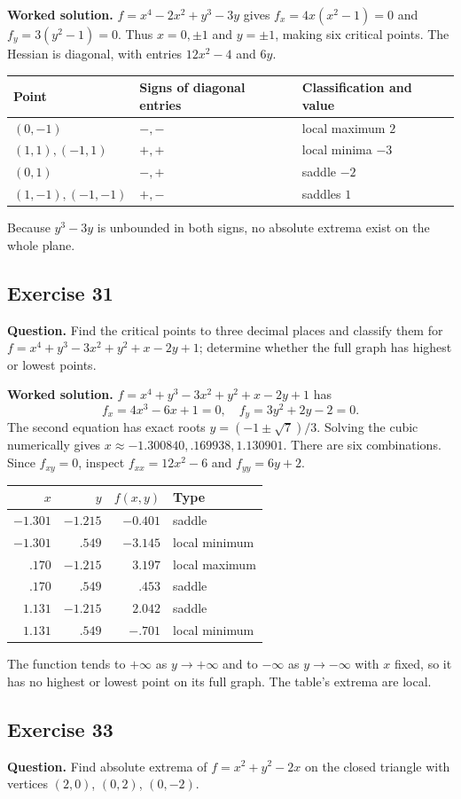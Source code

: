 \documentclass[11pt]{article}
\newcommand{\ex}[1]{\Needspace{8\baselineskip}\subsection*{Exercise #1}}
\begin{document}
\textbf{Worked solution.}
$f=x^4-2x^2+y^3-3y$ gives $f_x=4x(x^2-1)=0$ and $f_y=3(y^2-1)=0$. Thus $x=0,\pm1$ and $y=\pm1$, making six critical points. The Hessian is diagonal, with entries $12x^2-4$ and $6y$.
\begin{center}\begin{tabular}{lll}\toprule Point&Signs of diagonal entries&Classification and value\\\midrule
$(0,-1)$&$-,-$&local maximum $2$\\
$(1,1),(-1,1)$&$+,+$&local minima $-3$\\
$(0,1)$&$-,+$&saddle $-2$\\
$(1,-1),(-1,-1)$&$+,-$&saddles $1$\\\bottomrule\end{tabular}\end{center}
Because $y^3-3y$ is unbounded in both signs, no absolute extrema exist on the whole plane.
\ex{31}
\textbf{Question.} Find the critical points to three decimal places and classify them for $f=x^4+y^3-3x^2+y^2+x-2y+1$; determine whether the full graph has highest or lowest points.

\textbf{Worked solution.}
$f=x^4+y^3-3x^2+y^2+x-2y+1$ has
\[f_x=4x^3-6x+1=0,\quad f_y=3y^2+2y-2=0.\]
The second equation has exact roots $y=(-1\pm\sqrt7)/3$. Solving the cubic numerically gives $x\approx-1.300840,.169938,1.130901$. There are six combinations. Since $f_{xy}=0$, inspect $f_{xx}=12x^2-6$ and $f_{yy}=6y+2$.
\begin{center}\begin{tabular}{rrrl}\toprule $x$&$y$&$f(x,y)$&Type\\\midrule
$-1.301$&$-1.215$&$-0.401$&saddle\\
$-1.301$&$.549$&$-3.145$&local minimum\\
$.170$&$-1.215$&$3.197$&local maximum\\
$.170$&$.549$&$.453$&saddle\\
$1.131$&$-1.215$&$2.042$&saddle\\
$1.131$&$.549$&$-.701$&local minimum\\
\bottomrule\end{tabular}\end{center}
The function tends to $+\infty$ as $y\to+\infty$ and to $-\infty$ as $y\to-\infty$ with $x$ fixed, so it has no highest or lowest point on its full graph. The table's extrema are local.
\ex{33}
\textbf{Question.} Find absolute extrema of $f=x^2+y^2-2x$ on the closed triangle with vertices $(2,0)$, $(0,2)$, $(0,-2)$.
\end{document}

